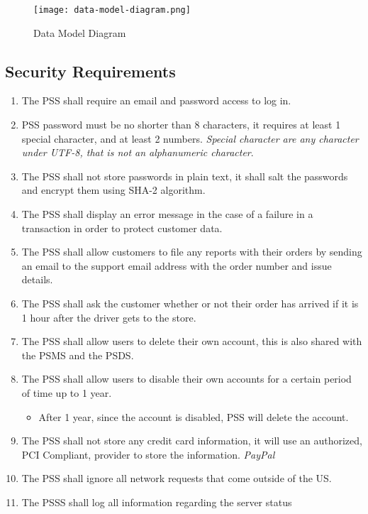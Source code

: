 \begin{figure}[!htbp]
    \centering
    \texttt{[image: data-model-diagram.png]}
    \caption{Data Model Diagram}
    \label{fig:data-model-diagram}
\end{figure}
\FloatBarrier
\pagebreak
\subsection{Security Requirements}
\begin{enumerate}[label=SEC-\arabic*]
    \item The PSS shall require an email and password access to log in.
    \item PSS password must be no shorter than 8 characters, it requires
    at least 1 special character, and at least 2 numbers. \textit{Special 
    character are any character under UTF-8, that is not an alphanumeric 
    character}.
    \item The PSS shall not store passwords in plain text, it shall salt the 
    passwords and encrypt them using SHA-2 algorithm.
    \item The PSS shall display an error message in the case of a failure in a 
    transaction in order to protect customer data.
    \item The PSS shall allow customers to file any reports with their orders 
    by sending an email to the support email address with the order number and 
    issue details.
    \item The PSS shall ask the customer whether or not their order has arrived 
    if it is 1 hour after the driver gets to the store.
    \item The PSS shall allow users to delete their own account, this is also 
    shared with the PSMS and the PSDS.
    \item The PSS shall allow users to disable their own accounts for a certain 
    period of time up to 1 year.
    \begin{itemize}
        \item After 1 year, since the account is disabled, PSS will delete 
        the account.
    \end{itemize}
    \item The PSS shall not store any credit card information, it will use an 
    authorized, PCI Compliant, provider to store the 
    information. \textit{PayPal}
    \item The PSS shall ignore all network requests that come outside of the US.
    \item The PSSS shall log all information regarding the server status 

\end{enumerate}
